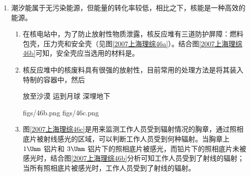 \documentclass[\gkver]{gaokaozhenti}
\begin{document}
\begin{enumerate}
\begin{enumerate}
\end{enumerate}


\item
潮汐能属于无污染能源，但能量的转化率较低，相比之下，核能是一种高效的能源。

\begin{enumerate}
	\item
	在核电站中，为了防止放射性物质泄露，核反应堆有三道防护屏障：燃料包壳，压力壳和安全壳（见图\ref{2007上海理综46a}）。结合图\ref{2007上海理综46b}可知，安全壳应当选用的材料是。

	\item
	核反应堆中的核废料具有很强的放射性，目前常用的处理方法是将其装入特制的容器中，然后

	{放至沙漠}
	{运到月球}
	{深埋地下}

	{figs/46b.png}
	{figs/46c.png}

	\item
	图\ref{2007上海理综46c}是用来监测工作人员受到辐射情况的胸章，通过照相底片被射线感光的区域，可以判断工作人员受到何种辐射。当胸章上 $1\Umm$ 铝片和 $3\Umm$ 铝片下的照相底片被感光，而铅片下的照相底片未被感光时，结合图\ref{2007上海理综46b}分析可知工作人员受到了\tkanswer[1cm]{$\beta$}射线的辐射；当所有照相底片被感光时，工作人员受到了\tkanswer[1cm]{$\gamma$}射线的辐射。
\end{enumerate}

\end{enumerate}
\end{document}
